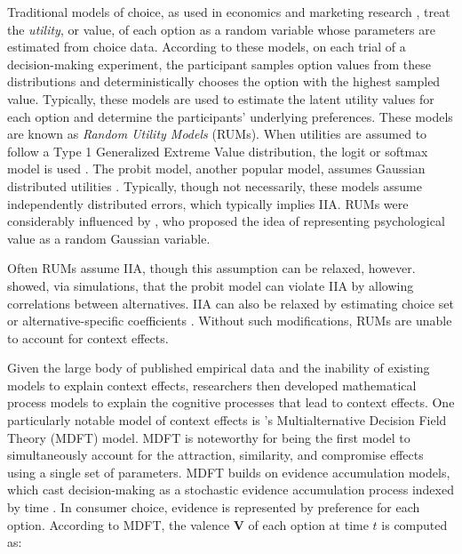 Traditional models of choice, as used in economics and marketing research \parencite{mcfadden2001economic}, treat the \textit{utility}, or value, of each option as a random variable whose parameters are estimated from choice data. According to these models, on each trial of a decision-making experiment, the participant samples option values from these distributions and deterministically chooses the option with the highest sampled value. Typically, these models are used to estimate the latent utility values for each option and determine the participants' underlying preferences. These models are known as \textit{Random Utility Models} (RUMs). When utilities are assumed to follow a Type 1 Generalized Extreme Value distribution, the logit or softmax model is used \parencite{gensch1979multinomial}. The probit model, another popular model, assumes Gaussian distributed utilities \parencite{mcfadden1980econometric}. Typically, though not necessarily, these models assume independently distributed errors, which typically implies IIA. 
RUMs were considerably influenced by \textcite{thurstone1927law}, who proposed the idea of representing psychological value as a random Gaussian variable.


Often RUMs assume IIA, though this assumption can be relaxed, however. \textcite{paetzUtilityIndependenceIIA2018} showed, via simulations, that the probit model can violate IIA by allowing correlations between alternatives. IIA can also be relaxed by estimating choice set or alternative-specific coefficients \parencite{rooderkerk2011incorporating}. Without such modifications, RUMs are unable to account for context effects. 

Given the large body of published empirical data and the inability of existing models to explain context effects, researchers then developed mathematical process models to explain the cognitive processes that lead to context effects. One particularly notable model of context effects is \textcite{roeMultialternativeDecisionField2001a}'s Multialternative Decision Field Theory (MDFT) model. MDFT is noteworthy for being the first model to simultaneously account for the attraction, similarity, and compromise effects using a single set of parameters. MDFT builds on evidence accumulation models, which cast decision-making as a stochastic evidence accumulation process indexed by time \parencite{ratcliff1978theory}. In consumer choice, evidence is represented by preference for each option. According to MDFT, the valence $\boldsymbol{V}$ of each option at time $t$ is computed as:

